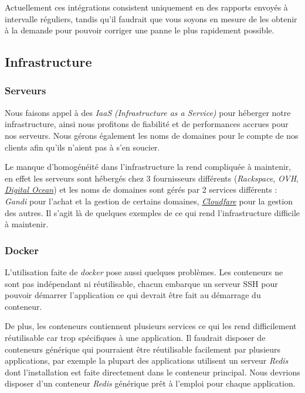 \bigskip

Actuellement ces intégrations consistent uniquement en des rapports
envoyés à intervalle réguliers, tandis qu'il faudrait que vous soyons en
mesure de les obtenir à la demande pour pouvoir corriger une panne le
plus rapidement possible.

\newpage

\subsection{Infrastructure}\label{infrastructure}

\bigskip

\subsubsection{Serveurs}\label{serveurs}

\bigskip

Nous faisons appel à des \emph{IaaS} \emph{(Infrastructure as a
Service)} pour héberger notre infrastructure, ainsi nous profitons de
fiabilité et de performances accrues pour nos serveurs. Nous gérons
également les noms de domaines pour le compte de nos clients afin qu'ils
n'aient pas à s'en soucier.

\bigskip

Le manque d'homogénéité dans l'infrastructure la rend compliquée à
maintenir, en effet les serveurs sont hébergés chez 3 fournisseurs
différents (\emph{Rackspace}, \emph{OVH},
\href{http://digitalocean.com}{\emph{Digital Ocean}}) et les noms de
domaines sont gérés par 2 services différents : \emph{Gandi} pour
l'achat et la gestion de certains domaines,
\href{http://cloudfare.com}{\emph{Cloudfare}} pour la gestion des
autres. Il s'agit là de quelques exemples de ce qui rend
l'infrastructure difficile à maintenir.

\subsubsection{Docker}\label{docker}

\bigskip

L'utilisation faite de \emph{docker} pose aussi quelques problèmes. Les
conteneurs ne sont pas indépendant ni réutilisable, chacun embarque un
serveur SSH pour pouvoir démarrer l'application ce qui devrait être fait
au démarrage du conteneur.

\bigskip

De plus, les conteneurs contiennent plusieurs services ce qui les rend
difficilement réutilisable car trop spécifiques à une application. Il
faudrait disposer de conteneurs générique qui pourraient être
réutilisable facilement par plusieurs applications, par exemple la
plupart des applications utilisent un serveur \emph{Redis} dont
l'installation est faite directement dans le conteneur principal. Nous
devrions disposer d'un conteneur \emph{Redis} générique prêt à l'emploi
pour chaque application.

